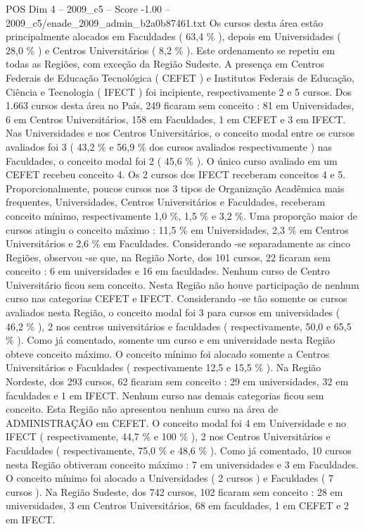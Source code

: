 \begin{textsample}{POS Dim 4 – 2009\_c5 – Score -1.00 – 2009\_c5/enade\_2009\_admin\_b2a0b87461.txt}
Os cursos desta área estão principalmente alocados em Faculdades ( 63,4 \% ), depois em Universidades ( 28,0 \% ) e Centros Universitários ( 8,2 \% ).
Este ordenamento se repetiu em todas as Regiões, com exceção da Região Sudeste.
A presença em Centros Federais de Educação Tecnológica ( CEFET ) e Institutos Federais de Educação, Ciência e Tecnologia ( IFECT ) foi incipiente, respectivamente 2 e 5 cursos.
Dos 1.663 cursos desta área no País, 249 ficaram sem conceito : 81 em Universidades, 6 em Centros Universitários, 158 em Faculdades, 1 em CEFET e 3 em IFECT.
Nas Universidades e nos Centros Universitários, o conceito modal entre os cursos avaliados foi 3 ( 43,2 \% e 56,9 \% dos cursos avaliados respectivamente ) nas Faculdades, o conceito modal foi 2 ( 45,6 \% ).
O único curso avaliado em um CEFET recebeu conceito 4.
Os 2 cursos dos IFECT receberam conceitos 4 e 5.
Proporcionalmente, poucos cursos nos 3 tipos de Organização Acadêmica mais frequentes, Universidades, Centros Universitários e Faculdades, receberam conceito mínimo, respectivamente 1,0 \%, 1,5 \% e 3,2 \%.
Uma proporção maior de cursos atingiu o conceito máximo : 11,5 \% em Universidades, 2,3 \% em Centros Universitários e 2,6 \% em Faculdades.
Considerando -se separadamente as cinco Regiões, observou -se que, na Região Norte, dos 101 cursos, 22 ficaram sem conceito : 6 em universidades e 16 em faculdades.
Nenhum curso de Centro Universitário ficou sem conceito.
Nesta Região não houve participação de nenhum curso nas categorias CEFET e IFECT.
Considerando -se tão somente os cursos avaliados nesta Região, o conceito modal foi 3 para cursos em universidades ( 46,2 \% ), 2 nos centros universitários e faculdades ( respectivamente, 50,0 e 65,5 \% ).
Como já comentado, somente um curso e em universidade nesta Região obteve conceito máximo.
O conceito mínimo foi alocado somente a Centros Universitários e Faculdades ( respectivamente 12,5 e 15,5 \% ).
Na Região Nordeste, dos 293 cursos, 62 ficaram sem conceito : 29 em universidades, 32 em faculdades e 1 em IFECT.
Nenhum curso nas demais categorias ficou sem conceito.
Esta Região não apresentou nenhum curso na área de ADMINISTRAÇÃO em CEFET.
O conceito modal foi 4 em Universidade e no IFECT ( respectivamente, 44,7 \% e 100 \% ), 2 nos Centros Universitários e Faculdades ( respectivamente, 75,0 \% e 48,6 \% ).
Como já comentado, 10 cursos nesta Região obtiveram conceito máximo : 7 em universidades e 3 em Faculdades.
O conceito mínimo foi alocado a Universidades ( 2 cursos ) e Faculdades ( 7 cursos ).
Na Região Sudeste, dos 742 cursos, 102 ficaram sem conceito : 28 em universidades, 3 em Centros Universitários, 68 em faculdades, 1 em CEFET e 2 em IFECT.

\end{textsample}

